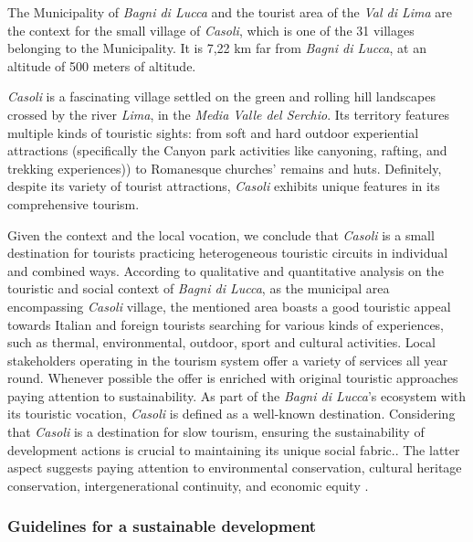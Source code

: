 \documentclass[sustainability,article,submit,pdftex,moreauthors]{Definitions/mdpi}
\begin{document}
The Municipality of \emph{Bagni di Lucca} and the tourist area of the \emph{Val di Lima} are the context for the small village of \emph{Casoli}, which is one of the 31 villages belonging to the Municipality. It is 7,22 km far from \emph{Bagni di Lucca}, at an altitude of 500 meters of altitude.

\emph{Casoli} is a fascinating village settled on the green and rolling hill landscapes crossed by the river \emph{Lima}, in the \emph{Media Valle del Serchio}. Its territory features multiple kinds of touristic sights: from soft and hard outdoor experiential attractions (specifically the Canyon park activities like canyoning, rafting, and trekking experiences)) to Romanesque churches’ remains and huts. Definitely, despite its variety of tourist attractions, \emph{Casoli} exhibits unique features in its comprehensive tourism.


Given the context and the local vocation, we conclude that \emph{Casoli} is a small destination for tourists practicing heterogeneous touristic circuits in individual and combined ways. According to qualitative and quantitative analysis \cite{loz09} on the touristic and social context of \emph{Bagni di Lucca}, as the municipal area encompassing \emph{Casoli} village, the mentioned area boasts a good touristic appeal towards Italian and foreign tourists searching for various kinds of experiences, such as thermal, environmental, outdoor, sport and cultural activities. Local stakeholders operating in the tourism system offer a variety of services all year round. Whenever possible the offer is enriched with original touristic approaches paying attention to sustainability. As part of the \emph{Bagni di Lucca}’s ecosystem with its touristic vocation, \emph{Casoli} is defined as a well-known destination. Considering that \emph{Casoli} is a destination for slow tourism, ensuring the sustainability of development actions is crucial to maintaining its unique social fabric.. The latter aspect suggests paying attention to environmental conservation, cultural heritage conservation, intergenerational continuity, and economic equity \cite{kuh10}.

\subsubsection{Guidelines for a sustainable development}
\end{document}

